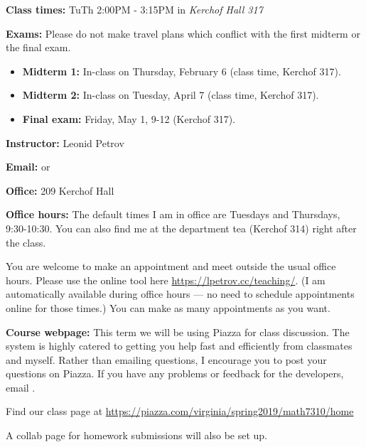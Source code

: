 \documentclass[oneside,11pt]{amsart}
\begin{document}
\textbf{Class times:}   TuTh 2:00PM - 3:15PM in
\emph{Kerchof Hall 317}

\medskip


\textbf{Exams:} Please do not make travel plans which conflict
with the first midterm or the final exam.
\begin{itemize}
	\item \textbf{Midterm 1:} In-class on Thursday, February 6 (class time, Kerchof 317).
	\item \textbf{Midterm 2:} In-class on Tuesday, April 7 (class time, Kerchof 317).
	\item \textbf{Final exam:} Friday, May 1, 9-12 (Kerchof 317).
\end{itemize}

\medskip

\textbf{Instructor:} Leonid Petrov
\medskip

\textbf{Email:}  or 
\medskip

\textbf{Office:} 209 Kerchof Hall
\medskip

\textbf{Office hours:}
The default times I am in office are Tuesdays and Thursdays, 9:30-10:30.
You can also find me at the department tea (Kerchof 314) right after the class.

You are welcome to make an appointment and meet outside the usual office hours. 
Please use the online tool here
\url{https://lpetrov.cc/teaching/}. (I am automatically available during office hours --- 
no need to schedule appointments online for those times.)
You can make as 
many appointments as you want.

\medskip

\textbf{Course webpage:}
This term we will be using Piazza for class discussion. The system is highly catered to getting you help fast and efficiently from classmates and myself. Rather than emailing questions, I encourage you to post your questions on Piazza. If you have any problems or feedback for the developers, email .

Find our class page at \url{https://piazza.com/virginia/spring2019/math7310/home}

A collab page for homework submissions will also be set up.
\end{document}
